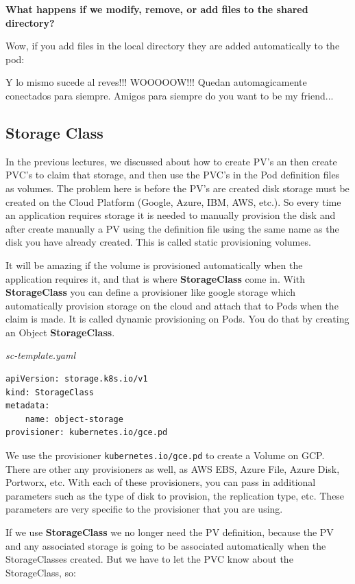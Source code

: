 \documentclass{article}
\newenvironment{codetemplate}[1][]{%
  \mybasecolorbox[#1]
  \itshape
}{%
  \endmybasecolorbox
}
\begin{document}
\textbf{What happens if we modify, remove, or add files to the shared directory?}

Wow, if you add files in the local directory they are added automatically to the pod:

Y lo mismo sucede al reves!!! WOOOOOW!!! Quedan automagicamente conectados para siempre. Amigos para siempre do you want to be my friend...

\subsection{Storage Class}

In the previous lectures, we discussed about how to create PV's an then create PVC's to claim that storage, and then use the PVC's in the Pod definition files as volumes. The problem here is before the PV's are created disk storage must be created on the Cloud Platform (Google, Azure, IBM, AWS, etc.). So every time an application requires storage it is needed to manually provision the disk and after create manually a PV using the definition file using the same name as the disk you have already created. This is called static provisioning volumes.

It will be amazing if the volume is provisioned automatically when the application requires it, and that is where \textbf{StorageClass} come in. With \textbf{StorageClass} you can define a provisioner like google storage which automatically provision storage on the cloud and attach that to Pods when the claim is made. It is called dynamic provisioning on Pods. You do that by creating an Object \textbf{StorageClass}.

\begin{codetemplate}{sc-template.yaml}
\begin{verbatim}
apiVersion: storage.k8s.io/v1
kind: StorageClass
metadata:
    name: object-storage
provisioner: kubernetes.io/gce.pd
\end{verbatim}
\end{codetemplate}

We use the provisioner \verb|kubernetes.io/gce.pd| to create a Volume on GCP. There are other any provisioners as well, as AWS EBS, Azure File, Azure Disk, Portworx, etc. With each of these provisioners, you can pass in additional parameters such as the type of disk to provision, the replication type, etc. These parameters are very specific to the provisioner that you are using.

If we use \textbf{StorageClass} we no longer need the PV definition, because the PV and any associated storage is going to be associated automatically when the StorageClasses created. But we have to let the PVC know about the StorageClass, so:
\end{document}
